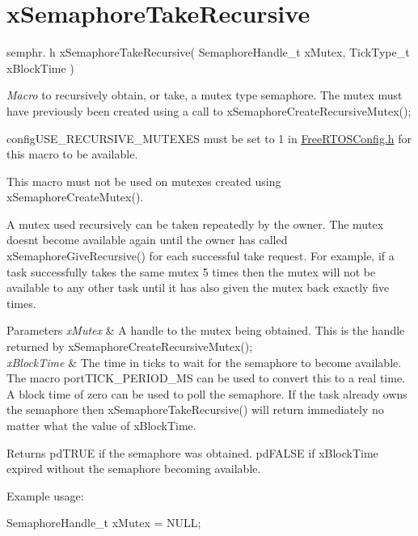 \hypertarget{group__x_semaphore_take_recursive}{}\section{x\+Semaphore\+Take\+Recursive}
\label{group__x_semaphore_take_recursive}
semphr. h x\+Semaphore\+Take\+Recursive( Semaphore\+Handle\+\_\+t x\+Mutex, Tick\+Type\+\_\+t x\+Block\+Time )

{\itshape Macro} to recursively obtain, or \textquotesingle{}take\textquotesingle{}, a mutex type semaphore. The mutex must have previously been created using a call to x\+Semaphore\+Create\+Recursive\+Mutex();

config\+U\+S\+E\+\_\+\+R\+E\+C\+U\+R\+S\+I\+V\+E\+\_\+\+M\+U\+T\+E\+X\+ES must be set to 1 in \hyperlink{_free_r_t_o_s_config_8h_source}{Free\+R\+T\+O\+S\+Config.\+h} for this macro to be available.

This macro must not be used on mutexes created using x\+Semaphore\+Create\+Mutex().

A mutex used recursively can be \textquotesingle{}taken\textquotesingle{} repeatedly by the owner. The mutex doesn\textquotesingle{}t become available again until the owner has called x\+Semaphore\+Give\+Recursive() for each successful \textquotesingle{}take\textquotesingle{} request. For example, if a task successfully \textquotesingle{}takes\textquotesingle{} the same mutex 5 times then the mutex will not be available to any other task until it has also \textquotesingle{}given\textquotesingle{} the mutex back exactly five times.


\begin{DoxyParams}{Parameters}
{\em x\+Mutex} & A handle to the mutex being obtained. This is the handle returned by x\+Semaphore\+Create\+Recursive\+Mutex();\\
\hline
{\em x\+Block\+Time} & The time in ticks to wait for the semaphore to become available. The macro port\+T\+I\+C\+K\+\_\+\+P\+E\+R\+I\+O\+D\+\_\+\+MS can be used to convert this to a real time. A block time of zero can be used to poll the semaphore. If the task already owns the semaphore then x\+Semaphore\+Take\+Recursive() will return immediately no matter what the value of x\+Block\+Time.\\
\hline
\end{DoxyParams}
\begin{DoxyReturn}{Returns}
pd\+T\+R\+UE if the semaphore was obtained. pd\+F\+A\+L\+SE if x\+Block\+Time expired without the semaphore becoming available.
\end{DoxyReturn}
Example usage\+: 
\begin{DoxyPre}
SemaphoreHandle\_t xMutex = NULL;\end{DoxyPre}



